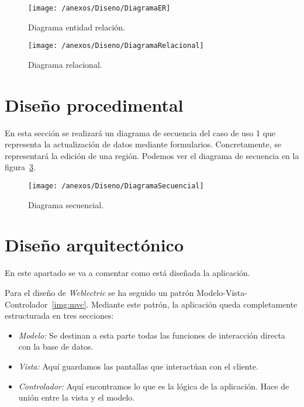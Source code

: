 \begin{figure}[h]
	\centering
	\texttt{[image: /anexos/Diseno/DiagramaER]}
	\caption{Diagrama entidad relación.}
	\label{img:modeloER}
\end{figure}

\begin{figure}[h]
	\centering
	\texttt{[image: /anexos/Diseno/DiagramaRelacional]}
	\caption{Diagrama relacional.}
	\label{img:modeloRelacional}
\end{figure}

\newpage


\section{Diseño procedimental}

En esta sección se realizará un diagrama de secuencia del caso de uso 1 que representa la actualización de datos mediante formularios. Concretamente, se representará la edición de una región. Podemos ver el diagrama de secuencia en la figura~\ref{img:modeloSecuencial}.

\begin{figure}[h]
	\centering
	\texttt{[image: /anexos/Diseno/DiagramaSecuencial]}
	\caption{Diagrama secuencial.}
	\label{img:modeloSecuencial}
\end{figure}

\newpage

\section{Diseño arquitectónico}

En este apartado se va a comentar como está diseñada la aplicación.

Para el diseño de \textit{Weblectric} se ha seguido un patrón Modelo-Vista-Controlador~\ref{img:mvc}. Mediante este patrón, la aplicación queda completamente estructurada en tres secciones:

\begin{itemize}
	
	\item \textit{Modelo:} Se destinan a esta parte todas las funciones de interacción directa con la base de datos.
	
	\item \textit{Vista:} Aquí guardamos las pantallas que interactúan con el cliente.
	
	\item \textit{Controlador:} Aquí encontramos lo que es la lógica de la aplicación. Hace de unión entre la vista y el modelo.

\end{itemize}

